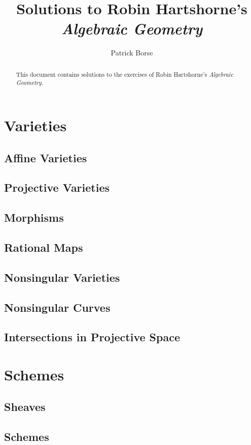 \documentclass[oneside]{amsbook}
\title{Solutions to Robin Hartshorne's\\ \emph{Algebraic Geometry}}
\author{Patrick Borse}
\begin{document}
\begin{abstract}
This document contains solutions to the exercises of Robin Hartshorne's \emph{Algebraic Geometry}.
\end{abstract}

\maketitle

\tableofcontents

\chapter{Varieties}
\section{Affine Varieties}

\section{Projective Varieties}

\section{Morphisms}

\section{Rational Maps}

\section{Nonsingular Varieties}

\section{Nonsingular Curves}

\section{Intersections in Projective Space}


\chapter{Schemes}
\section{Sheaves}

\section{Schemes}

\end{document}
